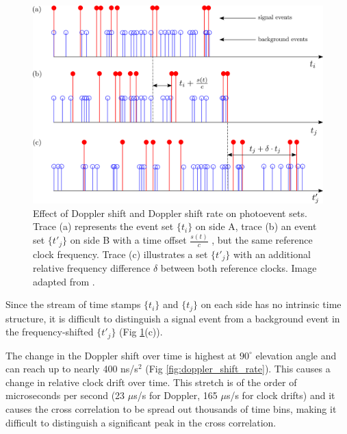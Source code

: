 \begin{figure}[ht!]
	\centering
	\includegraphics[width=0.95\linewidth]{assets/correlation_smear.png}
	\caption{Effect of Doppler shift and Doppler shift rate on photoevent sets. Trace (a) represents the event set $\{t_i\}$ on side  A, trace (b) an event  set $\{t′_j\}$ on side B  with a time offset $\frac{s(t)}{c}$ , but  the  same reference clock frequency. Trace (c) illustrates a set $\{t'_j\}$ with an additional relative frequency difference $\delta$ between both reference clocks. Image adapted from \cite{ho2009clock}.}
	\label{fig:correlation_smear}
\end{figure}

Since the stream of time stamps $\{t_i\}$ and $\{t_j\}$ on each side has no intrinsic time structure, it is difficult to distinguish a signal event from a background event in the frequency-shifted $\{t'_j\}$ (Fig \ref{fig:correlation_smear}(c)). 

The change in the Doppler shift over time is highest at $90^\circ$ elevation angle and can reach up to nearly 400 ns/s$^2$ (Fig \ref{fig:doppler_shift_rate}). This causes a change in relative clock drift over time. This stretch is of the order of microseconds per second (23 $\mu$s/s for Doppler, 165 $\mu$s/s for clock drifts) and it causes the cross correlation to be spread out thousands of time bins, making it difficult to distinguish a significant peak in the cross correlation.

